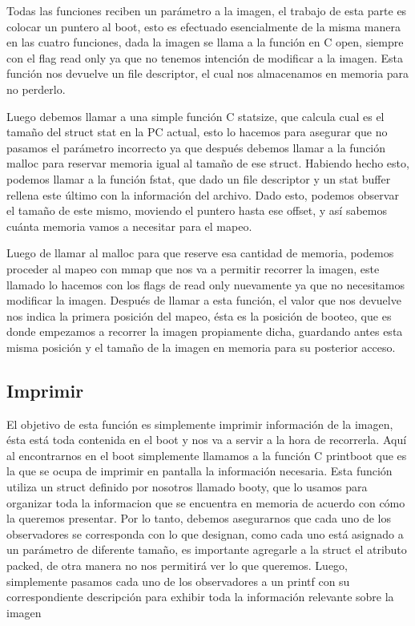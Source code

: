 \documentclass[a4paper,10pt]{article}
\begin{document}
Todas las funciones reciben un parámetro a la imagen, el trabajo de esta parte es colocar un puntero al boot, esto es efectuado esencialmente de la misma manera en las cuatro funciones, dada la imagen se llama a la función en C open, siempre con el flag read only ya que no tenemos intención de modificar a la imagen. Esta función nos devuelve un file descriptor, el cual nos almacenamos en memoria para no perderlo. 

Luego debemos llamar a una simple función C statsize, que calcula cual es el tamaño del struct stat en la PC actual, esto lo hacemos para asegurar que no pasamos el parámetro incorrecto ya que después debemos llamar a la función malloc para reservar memoria igual al tamaño de ese struct. Habiendo hecho esto, podemos llamar a la función fstat, que dado un file descriptor y un stat buffer rellena este último con la información del archivo. Dado esto, podemos observar el tamaño de este mismo, moviendo el puntero hasta ese offset, y así sabemos cuánta memoria vamos a necesitar para el mapeo.

Luego de llamar al malloc para que reserve esa cantidad de memoria, podemos proceder al mapeo con mmap que nos va a permitir recorrer la imagen, este llamado lo hacemos con los flags de read only nuevamente ya que no necesitamos modificar la imagen. Después de llamar a esta función, el valor que nos devuelve nos indica la primera posición del mapeo, ésta es la posición de booteo, que es donde empezamos a recorrer la imagen propiamente dicha, guardando antes esta misma posición y el tamaño de la imagen en memoria para su posterior acceso.

\subsection{Imprimir}

El objetivo de esta función es simplemente imprimir información de la imagen, ésta está toda contenida en el boot y nos va a servir a la hora de recorrerla. Aquí al encontrarnos en el boot simplemente llamamos a la función C printboot que es la que se ocupa de imprimir en pantalla la información necesaria. Esta función utiliza un struct definido por nosotros llamado booty, que lo usamos para organizar toda la informacion que se encuentra en memoria de acuerdo con cómo la queremos presentar. Por lo tanto, debemos asegurarnos que cada uno de los observadores se corresponda con lo que designan, como cada uno está asignado a un parámetro de diferente tamaño, es importante agregarle a la struct el atributo packed, de otra manera no nos permitirá ver lo que queremos. Luego, simplemente pasamos cada uno de los observadores a un printf con su correspondiente descripción para exhibir toda la información relevante sobre la imagen
\end{document}
